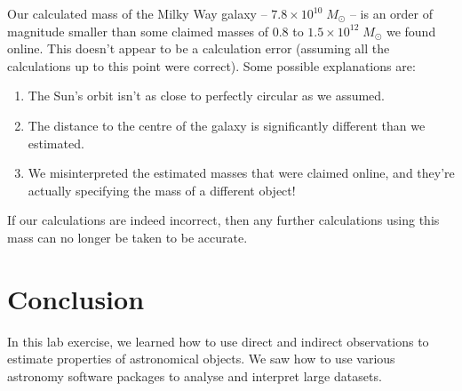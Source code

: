 \documentclass[11pt]{article}
\begin{document}
Our calculated mass of the Milky Way galaxy -- $7.8 \times 10^{10}\;M_\odot$ -- is an order of magnitude smaller than some claimed masses of $0.8$ to $1.5 \times 10^{12}\;M_\odot$ we found online.
This doesn't appear to be a calculation error (assuming all the calculations up to this point were correct).
Some possible explanations are:
\begin{enumerate}[label={\arabic*.}]
	\item The Sun's orbit isn't as close to perfectly circular as we assumed.
	\item The distance to the centre of the galaxy is significantly different than we estimated.
	\item We misinterpreted the estimated masses that were claimed online, and they're actually specifying the mass of a different object!
\end{enumerate}
If our calculations are indeed incorrect, then any further calculations using this mass can no longer be taken to be accurate.


\section{Conclusion}
In this lab exercise, we learned how to use direct and indirect observations to estimate properties of astronomical objects.
We saw how to use various astronomy software packages to analyse and interpret large datasets.


\printbibliography
\end{document}
